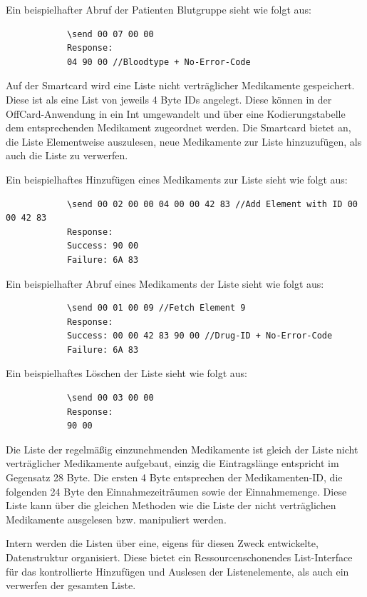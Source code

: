 \documentclass[parskip]{scrartcl}
\begin{document}
		Ein beispielhafter Abruf der Patienten Blutgruppe sieht wie folgt aus:
		
		\begin{lstlisting}
			\send 00 07 00 00
			Response:
			04 90 00 //Bloodtype + No-Error-Code
		\end{lstlisting}
		
		Auf der Smartcard wird eine Liste nicht verträglicher Medikamente gespeichert. Diese ist als eine List von jeweils 4 Byte IDs angelegt. Diese können in der OffCard-Anwendung in ein Int umgewandelt und über eine Kodierungstabelle dem entsprechenden Medikament zugeordnet werden. Die Smartcard bietet an, die Liste Elementweise auszulesen, neue Medikamente zur Liste hinzuzufügen, als auch die Liste zu verwerfen.
		
		Ein beispielhaftes Hinzufügen eines Medikaments zur Liste sieht wie folgt aus:
		
		\begin{lstlisting}
			\send 00 02 00 00 04 00 00 42 83 //Add Element with ID 00 00 42 83
			Response:
			Success: 90 00
			Failure: 6A 83
		\end{lstlisting}
		
		Ein beispielhafter Abruf eines Medikaments der Liste sieht wie folgt aus:
		
		\begin{lstlisting}
			\send 00 01 00 09 //Fetch Element 9
			Response:
			Success: 00 00 42 83 90 00 //Drug-ID + No-Error-Code
			Failure: 6A 83
		\end{lstlisting}
		
		Ein beispielhaftes Löschen der Liste sieht wie folgt aus:
			
		\begin{lstlisting}
			\send 00 03 00 00
			Response:
			90 00
		\end{lstlisting}
		
		Die Liste der regelmäßig einzunehmenden Medikamente ist gleich der Liste nicht verträg\-licher Medikamente aufgebaut, einzig die Eintragslänge entspricht im Gegensatz 28 Byte. Die ersten 4 Byte entsprechen der Medikamenten-ID, die folgenden 24 Byte den Einnahmezeiträumen sowie der Einnahmemenge. Diese Liste kann über die gleichen Methoden wie die Liste der nicht verträglichen Medikamente ausgelesen bzw. manipuliert werden.
		
		Intern werden die Listen über eine, eigens für diesen Zweck entwickelte, Datenstruktur organisiert. Diese bietet ein Ressourcenschonendes List-Interface für das kontrollierte Hinzufügen und Auslesen der Listenelemente, als auch ein verwerfen der gesamten Liste.
		
\end{document}

